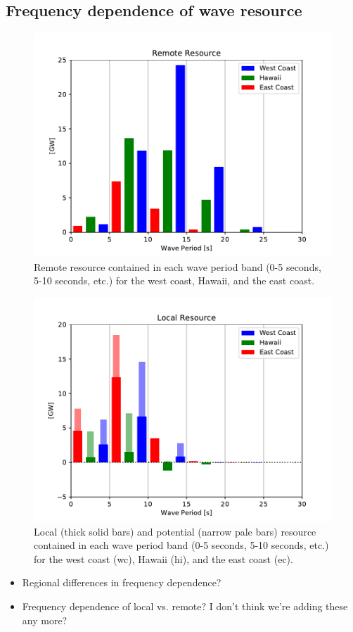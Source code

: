 \subsection{Frequency dependence of wave resource}

\begin{figure}[ht]
  \centering
  \includegraphics[width=\linewidth]{../fig/RemoteResource_Freq01.pdf}
  \caption{Remote resource contained in each wave period band (0-5 seconds, 5-10 seconds, etc.) for the west coast, Hawaii, and the east coast.}
  \label{fig:remote-freq}
\end{figure}

\begin{figure}[ht]
  \centering
  \includegraphics[width=\linewidth]{../fig/LocalResource_Freq01.pdf}
  \caption{Local (thick solid bars) and potential (narrow pale bars) resource contained in each wave period band (0-5 seconds, 5-10 seconds, etc.) for the west coast (wc), Hawaii (hi), and the east coast (ec).}
  \label{fig:remote-freq}
\end{figure}

\begin{itemize}
\item Regional differences in frequency dependence?
\item Frequency dependence of local vs. remote?
I don't think we're adding these any more?
\end{itemize}


